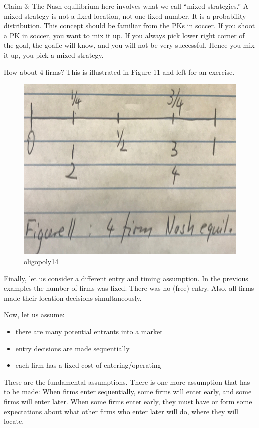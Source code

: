 \documentclass[
]{book}
\providecommand{\tightlist}{%
  \setlength{\itemsep}{0pt}\setlength{\parskip}{0pt}}
\begin{document}
Claim 3: The Nash equilibrium here involves what we call ``mixed strategies.'' A mixed strategy is not a fixed location, not one fixed number. It is a probability distribution. This concept should be familiar from the PKs in soccer. If you shoot a PK in soccer, you want to mix it up. If you always pick lower right corner of the goal, the goalie will know, and you will not be very successful. Hence you mix it up, you pick a mixed strategy.

How about 4 firms? This is illustrated in Figure 11 and left for an exercise.

\begin{figure}

{\centering \includegraphics[width=0.5\linewidth]{img/oligopoly/fig14} 

}

\caption{oligopoly14}\label{fig:oligopoly14}
\end{figure}

Finally, let us consider a different entry and timing assumption. In the previous examples the number of firms was fixed. There was no (free) entry. Also, all firms made their location decisions simultaneously.

Now, let us assume:

\begin{itemize}
\tightlist
\item
  there are many potential entrants into a market
\item
  entry decisions are made sequentially
\item
  each firm has a fixed cost of entering/operating
\end{itemize}

These are the fundamental assumptions. There is one more assumption that has to be made: When firms enter sequentially, some firms will enter early, and some firms will enter later. When some firms enter early, they must have or form some expectations about what other firms who enter later will do, where they will locate.
\end{document}
